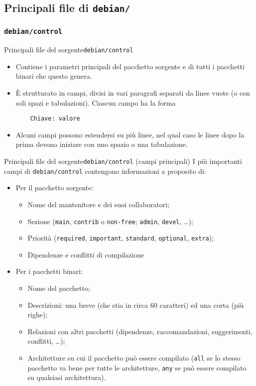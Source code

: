 \documentclass{beamer}
\begin{document}
\subsection{Principali file di {\tt debian/}}

\subsubsection{{\tt debian/control}}

\begin{frame}[fragile]{Principali file del sorgente}{{\tt debian/control}}
	\begin{itemize}
	\item Contiene i parametri principali del pacchetto sorgente e di tutti i pacchetti binari che questo genera.
	\pause
	\item È strutturato in campi, divisi in vari paragrafi separati da linee vuote (o con soli spazi e tabulazioni). Ciascun campo ha la forma
	\begin{verbatim}
	Chiave: valore
	\end{verbatim}
	\pause
	\item Alcuni campi possono estendersi su più linee, nel qual caso le linee dopo la prima devono iniziare con uno spazio o una tabulazione.
	\end{itemize}
\end{frame}

\begin{frame}{Principali file del sorgente}{{\tt debian/control} (campi principali)}
	I  più importanti campi di {\tt debian/control} contengono informazioni a proposito di:
	\begin{itemize}
	\pause
	\item Per il pacchetto sorgente:
		\begin{itemize}
		\pause
		\item Nome del mantenitore e dei suoi collaboratori;
		\pause
		\item Sezione ({\tt main}, {\tt contrib} o {\tt non-free}; {\tt admin}, {\tt devel}, \dots);
		\pause
		\item Priorità ({\tt required}, {\tt important}, {\tt standard}, {\tt optional}, {\tt extra});
		\pause
		\item Dipendenze e conflitti di compilazione
		\end{itemize}
	\pause
	\item Per i pacchetti binari:
		\begin{itemize}
		\pause
		\item Nome del pacchetto;
		\pause
		\item Descrizioni: una breve (che stia in circa 60 caratteri) ed una corta (più righe);
		\pause
		\item Relazioni con altri pacchetti (dipendenze, raccomandazioni, suggerimenti, conflitti, \dots);
		\pause
		\item Architetture su cui il pacchetto può essere compilato ({\tt all} se lo stesso pacchetto va bene per tutte le architetture, {\tt any} se può essere compilato su qualsiasi architettura).
		\end{itemize}
	\end{itemize}
\end{frame}
\end{document}
